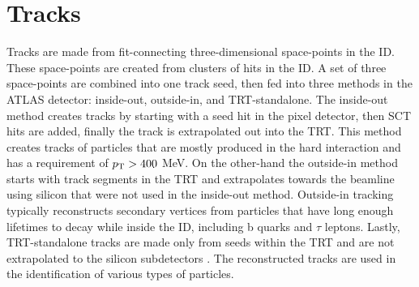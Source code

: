 	\section{Tracks}
		Tracks are made from fit-connecting three-dimensional space-points in the \gls{ID}. These space-points are created from clusters of hits in the \gls{ID}. A set of three space-points are combined into one track seed, then fed into three methods in the \gls{ATLAS} detector: inside-out,  outside-in, and \gls{TRT}-standalone. The inside-out method creates tracks by starting with a seed hit in the pixel detector, then \gls{SCT} hits are added, finally the track is extrapolated out into the TRT. This method creates tracks of particles that are mostly produced in the hard \pp interaction and has a requirement of $p_{\text{T}}>400$ MeV. On the other-hand the outside-in method starts with track segments in the \gls{TRT} and extrapolates towards the beamline using silicon that were not used in the inside-out method. Outside-in tracking typically reconstructs secondary vertices from particles that have long enough lifetimes to decay while inside the \gls{ID}, including b quarks and $\tau$ leptons. Lastly, \gls{TRT}-standalone tracks are made only from seeds within the \gls{TRT} and are not extrapolated to the silicon subdetectors \cite{ATLAS-perf-run2}. The reconstructed tracks are used in the identification of various types of particles.


